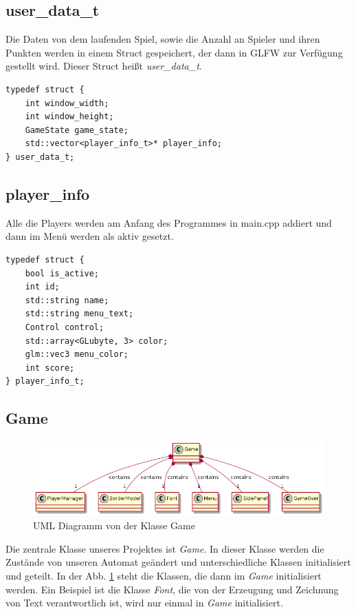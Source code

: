 \documentclass[doktyp=studarbeit]{TUBAFarbeiten}
\begin{document}
\subsection{user\_data\_t}

Die Daten von dem laufenden Spiel, sowie die Anzahl an Spieler und ihren Punkten
werden in einem Struct gespeichert, der dann in GLFW zur Verfügung gestellt wird.
Dieser Struct heißt \textit{user\_data\_t}.

\begin{lstlisting}[style=C++]
typedef struct {
    int window_width;
    int window_height;
    GameState game_state;
    std::vector<player_info_t>* player_info;
} user_data_t;
\end{lstlisting}

\subsection{player\_info}
Alle die Players werden am Anfang des Programmes in main.cpp addiert und dann
im Menü werden als aktiv gesetzt.

\begin{lstlisting}[style=C++]
typedef struct {
    bool is_active;
    int id;
    std::string name;
    std::string menu_text;
    Control control;
    std::array<GLubyte, 3> color;
    glm::vec3 menu_color;
    int score;
} player_info_t;
\end{lstlisting}

\subsection{Game}

\begin{figure}
    \centering
    \includegraphics[width=0.9\linewidth]{Game.png}
	\caption{UML Diagramm von der Klasse Game}
	\label{fig:game-uml}
\end{figure}

Die zentrale Klasse unseres Projektes ist \textit{Game}. In dieser Klasse 
werden die Zustände von unseren Automat geändert und unterschiedliche Klassen 
initialisiert und geteilt. In der Abb. \ref{fig:game-uml} steht die 
Klassen, die dann im \textit{Game} initialisiert werden. Ein Beispiel ist die 
Klasse \textit{Font}, die von der Erzeugung und Zeichnung von Text
verantwortlich ist, wird nur einmal in \textit{Game} initialisiert.  
\end{document}
